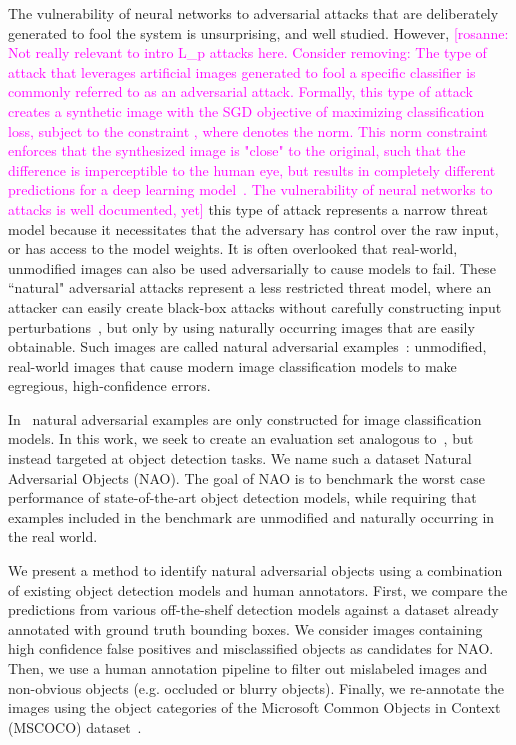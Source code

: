 \documentclass[final]{cvpr}
\newcommand{\comments}[1]{#1}
\newcommand{\comments}[1]{}
\newcommand{\rosanne}[1]{\comments{\textcolor{magenta}{[rosanne: #1]}}}
\begin{document}
 The vulnerability of neural networks to adversarial attacks that are deliberately generated to fool the system is unsurprising, and well studied. However,
 \rosanne{Not really relevant to intro L_p attacks here. Consider removing: 
 The type of attack that leverages artificial images generated to fool a specific classifier is commonly referred to as an  adversarial attack.
Formally, this type of attack creates a synthetic image  with the SGD objective of maximizing classification loss, subject to the constraint , where  denotes the  norm. This  norm constraint enforces that the synthesized image is "close" to the original, such that the difference is imperceptible to the human eye, but results in completely different predictions for a deep learning model~\cite{gilmer2018motivating}.
The vulnerability of neural networks to  attacks is well documented, yet}
this type of attack represents a narrow threat model because it necessitates that the adversary has control over the raw input, or has access to the model weights. It is often overlooked that real-world, unmodified images can also be used adversarially to cause models to fail. These ``natural" adversarial attacks represent a less restricted threat model, where an attacker can easily create black-box attacks without carefully constructing input perturbations~\cite{gilmer2018motivating}, but only by using  naturally occurring images that are easily obtainable. Such images are called natural adversarial examples~\cite{Hendrycks2019-cn}: unmodified, real-world images that cause modern image classification models to make egregious, high-confidence errors.

In~\cite{Hendrycks2019-cn} natural adversarial examples are only constructed for image classification models. In this work, we seek to create an evaluation set analogous to~\cite{Hendrycks2019-cn}, but instead targeted at object detection tasks. We name such a dataset Natural Adversarial Objects (NAO). The goal of NAO is to benchmark the worst case performance of state-of-the-art object detection models, while requiring that examples included in the benchmark are unmodified and naturally occurring in the real world. 

We present a method to identify natural adversarial objects using a combination of existing object detection models and human annotators.
First, we compare the predictions from various off-the-shelf detection models against a dataset already annotated with ground truth bounding boxes. We consider images containing high confidence false positives and misclassified objects as candidates for NAO.
Then, we use a human annotation pipeline to filter out mislabeled images and non-obvious objects (e.g. occluded or blurry objects). Finally, we re-annotate the images using the object categories of the Microsoft Common Objects in Context (MSCOCO) dataset~\cite{lin2014microsoft}.
\end{document}
